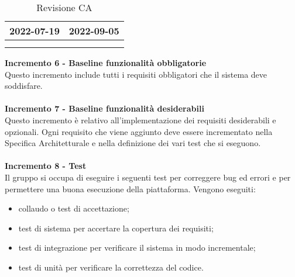 {{{\begin{longtable}{C{.4\freewidth} C{.4\freewidth}}
        2022-07-19 & 2022-09-05 \\
        \bottomrule
        \\
        \caption{Revisione CA}
        \end{longtable}
        
        
    \textbf{Incremento 6 - Baseline funzionalità obbligatorie} \\
    Questo incremento include tutti i requisiti obbligatori che il sistema deve soddisfare.\\ \\
    \textbf{Incremento 7 - Baseline funzionalità desiderabili} \\ 
    Questo incremento è relativo all'implementazione dei requisiti desiderabili e opzionali. Ogni requisito che viene aggiunto deve essere incrementato nella Specifica Architetturale e nella definizione dei vari test che si eseguono. \\ \\
    \textbf{Incremento 8 - Test} \\ 
    Il gruppo si occupa di eseguire i  seguenti test  per correggere bug ed errori e per permettere una buona esecuzione della piattaforma. Vengono eseguiti:
    \begin{itemize}
        \item collaudo o test di accettazione;
        \item test di sistema per accertare la copertura dei requisiti;
        \item test di integrazione per verificare il sistema in modo incrementale;
        \item test di unità per verificare la correttezza del codice.
    \end{itemize} 
    }

}
}
